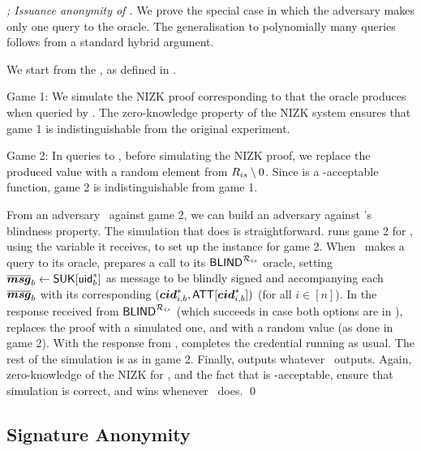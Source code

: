 \begin{proof}[; Issuance anonymity of \CUASGen]
  We prove the special case in which the adversary makes only one query to the
  \OBTCHALb oracle. The generalisation to polynomially many queries follows
  from a standard hybrid argument.

  We start from the \ExpIssAnonb, as defined in . 

  Game 1: We simulate the NIZK proof corresponding to \RelIss that
  the \OBTCHALb oracle produces when queried by \adv. The zero-knowledge
  property of the NIZK system ensures that game 1 is indistinguishable from
  the original experiment.

  Game 2: In queries to \OBTCHALb, before simulating the NIZK proof, we replace
  the produced \yissue value with a random element from $R_{is} \setminus
  0$. Since \fissue is a \UAS-acceptable function, game 2 is indistinguishable
  from game 1.

  From an adversary \adv~against game 2, we can build an adversary \advB against
  \SBCM's blindness property. The simulation that \advB does is straightforward.
  \advB runs game 2 for \adv, using the \SBCM \parm variable it receives, to
  set up the \SBCM instance for game 2. When \adv~makes a query to its \OBTCHALb
  oracle, \advB prepares a call to its $\mathsf{BLIND}^{\mathcal{R}_{is}}$ oracle, setting
  $\overline{\boldsymbol{msg}}_b \gets \mathsf{S}\mathsf{UK}[\mathsf{uid}^*_b]$ as message to be blindly signed and
  accompanying each $\overline{\boldsymbol{msg}}_b$ with its corresponding
  $(\boldsymbol{cid}^*_{i,b},\mathsf{ATT}[\boldsymbol{cid}^*_{i,b}])$ (for all $i\in[n]$). In the response
  received from $\mathsf{BLIND}^{\mathcal{R}_{is}}$ (which succeeds in case both options
  are in \RelIss), \advB replaces the proof with a simulated one, and \yissue
  with a random value (as done in game 2). With the response from \adv, \advB
  completes the credential running \SBCMUnblind as usual. The rest of the
  simulation is as in game 2. Finally, \advB outputs whatever \adv~outputs.
  Again, zero-knowledge of the NIZK for \RelIss, and the fact that \fissue is
  \UAS-acceptable, ensure that simulation is correct, and \advB wins whenever
  \adv~does.
  \qed
\end{proof}

\subsection{Signature Anonymity}

